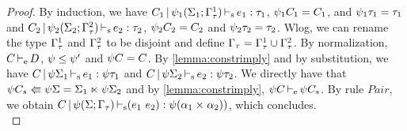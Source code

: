 \begin{theorem}
\begin{proof}





  By induction, we have
  $C_1 \operatorname{|} \mathrm{\psi}_1(\Sigma_1;\Gamma^1_\tau) \operatorname{\vdash_s} e_1 : \tau_1$, $\mathrm{\psi}_1 C_1 = C_1$,
  and $\mathrm{\psi}_1 \tau_1 = \tau_1$
  and
  $C_2 \operatorname{|} \mathrm{\psi}_2(\Sigma_2;\Gamma^2_\tau) \operatorname{\vdash_s} e_2 : \tau_2$, $\mathrm{\psi}_2 C_2 = C_2$
  and $\mathrm{\psi}_2 \tau_2 = \tau_2$.
  Wlog, we can rename the type $\Gamma^1_\tau$ and $\Gamma^2_\tau$ to be disjoint
  and define $\Gamma_\tau = \Gamma^1_\tau \cup \Gamma^2_\tau$.
  By normalization, $C \operatorname{\vdash_e} D$, $\mathrm{\psi} \leq \mathrm{\psi}'$ and $\mathrm{\psi} C = C$.
  By \cref{lemma:constrimply} and by substitution, we have
  $C \operatorname{|} \mathrm{\psi}\Sigma_1 \operatorname{\vdash_s} e_1 : \mathrm{\psi}\tau_1$ and
  $C \operatorname{|} \mathrm{\psi}\Sigma_2 \operatorname{\vdash_s} e_2 : \mathrm{\psi}\tau_2$.
  We directly have that
  $\mathrm{\psi} C_s \Lleftarrow \mathrm{\psi} \Sigma = \Sigma_1 \ltimes \mathrm{\psi}\Sigma_2$
  and by \cref{lemma:constrimply}, $\mathrm{\psi} C \operatorname{\vdash_e} \mathrm{\psi} C_s$.
  By rule $Pair$, we obtain
  $C \operatorname{|} \mathrm{\psi}(\Sigma;\Gamma_\tau) \operatorname{\vdash_s} (e_1\ e_2) : \mathrm{\psi}(\alpha_1 \times^{{}} \alpha_2))$,
  which concludes.
  \\





\end{proof}
\end{theorem}

